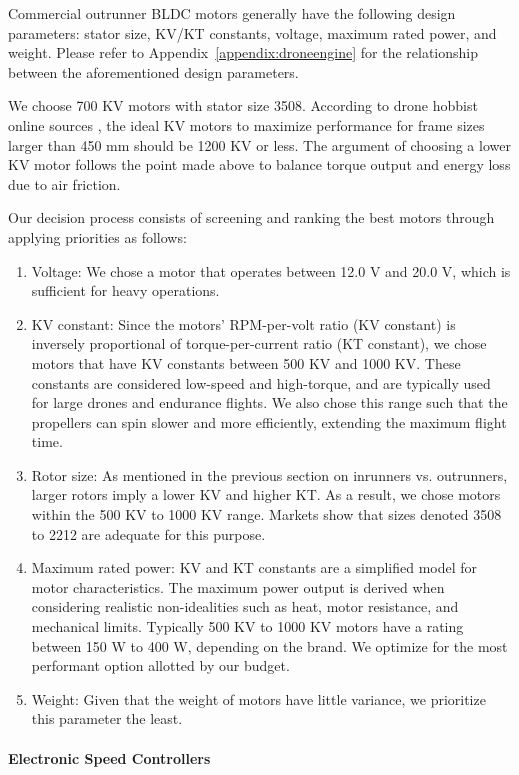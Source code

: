 Commercial outrunner BLDC motors generally have the following design parameters: stator size, KV/KT constants, voltage, maximum rated power, and weight. Please refer to Appendix~\ref{appendix:droneengine} for the relationship between the aforementioned design parameters. 

We choose 700 KV motors with stator size 3508.  According to drone hobbist online sources \cite{kv1, kv2}, the ideal KV motors to maximize performance for frame sizes larger than 450 mm should be 1200 KV or less. The argument of choosing a lower KV motor follows the point made above to balance torque output and energy loss due to air friction.

Our decision process consists of screening and ranking the best motors through applying priorities as follows:

\begin{enumerate}
    \item Voltage: We chose a motor that operates between 12.0 V and 20.0 V, which is sufficient for heavy operations.
    \item KV constant: Since the motors' RPM-per-volt ratio (KV constant) is inversely proportional of torque-per-current ratio (KT constant), we chose motors that have KV constants between 500 KV and 1000 KV. These constants are considered low-speed and high-torque, and are typically used for large drones and endurance flights. We also chose this range such that the propellers can spin slower and more efficiently, extending the maximum flight time.
    \item Rotor size: As mentioned in the previous section on inrunners vs. outrunners, larger rotors imply a lower KV and higher KT. As a result, we chose motors within the 500 KV to 1000 KV range. Markets show that sizes denoted 3508 to 2212 are adequate for this purpose.
    \item Maximum rated power: KV and KT constants are a simplified model for motor characteristics. The maximum power output is derived when considering realistic non-idealities such as heat, motor resistance, and mechanical limits. Typically 500 KV to 1000 KV motors have a rating between 150 W to 400 W, depending on the brand. We optimize for the most performant option allotted by our budget.
    \item Weight: Given that the weight of motors have little variance, we prioritize this parameter the least.
\end{enumerate}

\paragraph{Electronic Speed Controllers}

